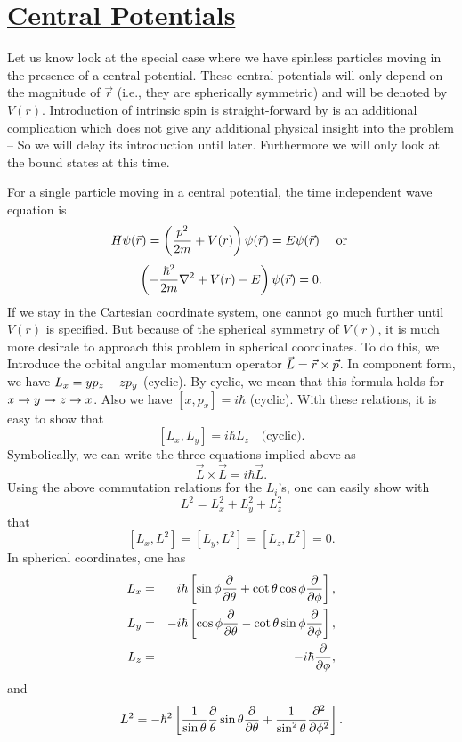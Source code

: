 \section{\underline{Central Potentials}}
Let us know look at the special case where we have spinless particles moving in the presence of a central potential. These central potentials will only depend on the magnitude of $\vec{r}$ (i.e., they are spherically symmetric) and will be denoted by $V(r)$. Introduction of intrinsic spin is straight-forward by is an additional complication which does not give any additional physical insight into the problem -- So we will delay its introduction until later. Furthermore we will only look
at the bound states at this time. 

For a single particle moving in a central potential, the time independent wave equation is
$$H\psi(\vec{r}) = \left( {p^2\over2m}+V(r)\right) \psi(\vec{r}) = E\psi(\vec{r}) \mbox{~~~ or  }$$
$$\left( -{\hbar^2\over2m}\nabla^2 + V(r) - E \right) \psi(\vec{r}) = 0.$$
If we stay in the Cartesian coordinate system, one cannot go much further until $V(r)$ is specified. But because of the spherical symmetry of $V(r)$, it is much more desirale to approach this problem in spherical coordinates. To do this, we
Introduce the orbital angular momentum operator $\displaystyle \vec{L} = \vec{r} \times \vec{p}$. In component form, we have $\displaystyle L_x = y p_z - zp_y$ (cyclic). By cyclic, we mean that this formula holds for $x\rightarrow y \rightarrow z \rightarrow x$. Also we have
$[x,p_x] = i\hbar$ (cyclic). With these relations, it is easy to show that 
$$[L_x, L_y] = i\hbar L_z\mbox{~~~(cyclic)}.$$
Symbolically, we can write the three equations implied above as 
$$\vec{L}\times \vec{L} = i\hbar \vec{L}.$$
Using the above commutation relations for the $L_i$'s, one can easily show with 
$$L^2 = L_x^2 + L_y^2 + L_z^2$$ that 
$$[L_x, L^2] = [L_y,L^2] = [L_z,L^2] = 0.$$
In spherical coordinates, one has 
\begin{eqnarray*}
L_x &=& ~i\hbar \left[ \sin\phi {\partial \over \partial \theta} + \cot\theta\cos\phi{\partial \over\partial\phi}\right],\\
L_y &=& -i\hbar \left[ \cos\phi {\partial \over \partial \theta} - \cot\theta\sin\phi{\partial \over\partial\phi}\right],\\
L_z &=& -i\hbar {\partial \over\partial\phi},
\end{eqnarray*}
and 
$$L^2 = -\hbar^2\left[ {1\over\sin\theta} {\partial\over\theta} \sin\theta {\partial\over\partial\theta} + {1\over\sin^2\theta} {\partial^2\over\partial\phi^2} \right].$$

